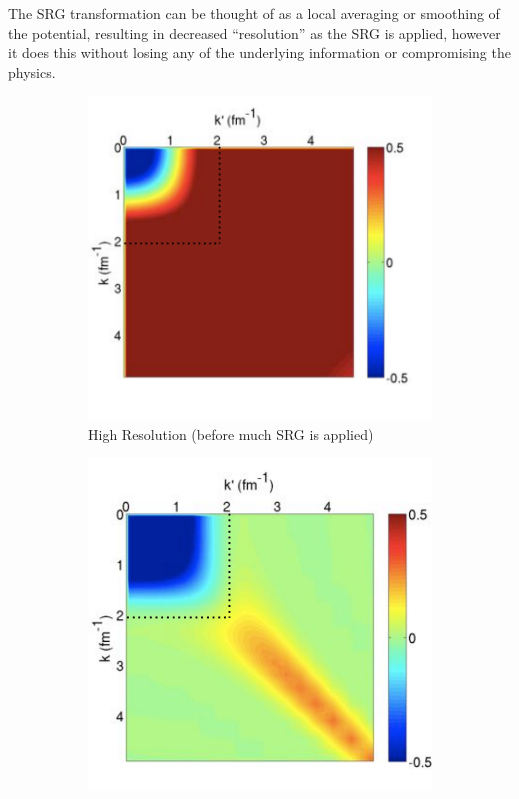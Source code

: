 \documentclass[a4paper,11pt]{article}
\begin{document}
The SRG transformation can be thought of as a local averaging or
smoothing of the potential, resulting in decreased ``resolution''
as the SRG is applied, however it does this without losing any of the underlying information or compromising the physics.
\begin{figure}[H]
  \centering
  \begin{subfigure}{0.45\textwidth}
    \centering
    \includegraphics[width=\linewidth]{HighRes.png}
    \caption{High Resolution (before much SRG is applied) }
    \label{fig:highres}
  \end{subfigure}
  \hfill
  \begin{subfigure}{0.45\textwidth}
    \centering
    \includegraphics[width=\linewidth]{LowRes.png}

\end{subfigure}
\end{figure}
\end{document}

